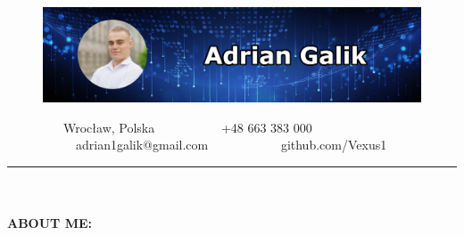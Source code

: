 \documentclass[10pt]{article}
\newcommand{\longline}{\rule{19.6cm}{1pt}}
\begin{document}
\begin{figure}[t]
    \hskip-1.55cm\includegraphics[scale=1.3625]{Galik_BANNER.png}
\end{figure}

\vspace*{-4ex}

\ \ \ \ \ \ \ \ \
\faMapMarker* Wrocław, Polska \ \ \ \ \ \ \ \ \ \
\faPhone +48 663 383 000 \ \ \ \ \ \ \ \ \ \
\faEnvelope \ adrian1galik@gmail.com \ \ \ \ \ \ \ \ \ \
\faGithub \ github.com/Vexus1


\noindent \longline 
\\ \\
\noindent \fontsize{14pt}{14pt}\selectfont \textbf{\color{Violet}ABOUT ME:}
\fontsize{10pt}{10pt}\selectfont
\end{document}
